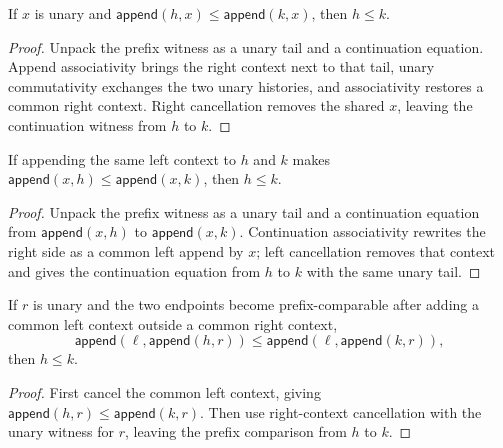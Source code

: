 \begin{theorem}
\label{thm:preorder-prefix-right-context-cancellation}
If \(x\) is unary and
\(\mathsf{append}(h,x)\le\mathsf{append}(k,x)\), then \(h\le k\).
\end{theorem}
\begin{proof}
Unpack the prefix witness as a unary tail and a continuation equation. Append
associativity brings the right context next to that tail, unary commutativity
exchanges the two unary histories, and associativity restores a common right
context. Right cancellation removes the shared \(x\), leaving the continuation
witness from \(h\) to \(k\).
\end{proof}

\begin{theorem}
\label{thm:preorder-prefix-left-context-cancellation}
If appending the same left context to \(h\) and \(k\) makes
\(\mathsf{append}(x,h)\le\mathsf{append}(x,k)\), then \(h\le k\).
\end{theorem}
\begin{proof}
Unpack the prefix witness as a unary tail and a continuation equation from
\(\mathsf{append}(x,h)\) to \(\mathsf{append}(x,k)\). Continuation associativity rewrites the
right side as a common left append by \(x\); left cancellation removes that
context and gives the continuation equation from \(h\) to \(k\) with the same
unary tail.
\end{proof}

\begin{theorem}
\label{thm:preorder-prefix-cancel-both-context}
If \(r\) is unary and the two endpoints become prefix-comparable after adding a
common left context outside a common right context,
$$
\mathsf{append}(\ell,\mathsf{append}(h,r))\le
\mathsf{append}(\ell,\mathsf{append}(k,r)),
$$
then \(h\le k\).
\end{theorem}
\begin{proof}
First cancel the common left context, giving
\(\mathsf{append}(h,r)\le\mathsf{append}(k,r)\). Then use right-context
cancellation with the unary witness for \(r\), leaving the prefix comparison
from \(h\) to \(k\).
\end{proof}

